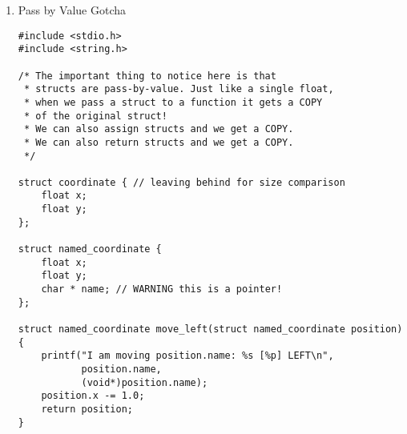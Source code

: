 \documentclass[11pt]{article}
\begin{document}
\begin{enumerate}
\begin{verbatim}
/* A common thing to do is to typedef a struct
 * so that you don't have to type struct whatever
 * so often.
 */

struct coordinate {
    float x;
    float y;
};

// We use a capital first letter to indicate a type
// This is a newer style.
typedef struct coordinate Coordinate;
// Or we could use "_t" at the end.
// This is an older style. Remember uint64_t?
typedef struct coordinate coordinate_t;

Coordinate move_left(Coordinate position) {
    position.x -= 1.0;
    return position;
}

int main() {
    Coordinate position = { 0, 0 };
    printf("position=(%g,%g)\n",
           position.x,
           position.y
    );
    Coordinate new_position = move_left(position);
    printf("position=(%g,%g)\n",
           position.x,
           position.y
    );
    printf("new_position=(%g,%g)\n",
           new_position.x,
           new_position.y
    );
    position = move_left(move_left(position));
    printf("position=(%g,%g)\n",
           position.x,
           position.y
    );
}
\end{verbatim}

\begin{verbatim}
position=(0,0)
position=(0,0)
new_position=(-1,0)
position=(-2,0)
\end{verbatim}


\item Pass by Value Gotcha
\label{sec:org0757427}

\begin{verbatim}
#include <stdio.h>
#include <string.h>

/* The important thing to notice here is that
 * structs are pass-by-value. Just like a single float,
 * when we pass a struct to a function it gets a COPY
 * of the original struct!
 * We can also assign structs and we get a COPY.
 * We can also return structs and we get a COPY.
 */

struct coordinate { // leaving behind for size comparison
    float x;
    float y;
};

struct named_coordinate {
    float x;
    float y;
    char * name; // WARNING this is a pointer!
};

struct named_coordinate move_left(struct named_coordinate position) {
    printf("I am moving position.name: %s [%p] LEFT\n", 
           position.name, 
           (void*)position.name);
    position.x -= 1.0;
    return position;
}


\end{verbatim}
\end{enumerate}
\end{document}
